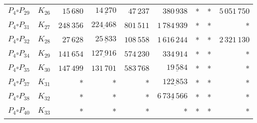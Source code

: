 \begin{tabular}{ccrrrrrrr}
$P_4\square P_{29}$ & $K_{26}$ & $15\,680$ & $\underline{14\,270}$ & $47\,237$ & $380\,938$ & * & * & $5\,051\,750$\\
$P_4\square P_{31}$ & $K_{27}$ & $248\,356$ & $\underline{224\,468}$ & $801\,511$ & $1\,784\,939$ & * & * & *\\
$P_4\square P_{32}$ & $K_{28}$ & $27\,628$ & $\underline{25\,833}$ & $108\,558$ & $1\,616\,244$ & * & * & $2\,321\,130$\\
$P_4\square P_{34}$ & $K_{29}$ & $141\,654$ & $\underline{127\,916}$ & $574\,230$ & $334\,914$ & * & * & *\\
$P_4\square P_{35}$ & $K_{30}$ & $147\,499$ & $131\,701$ & $583\,768$ & $\underline{19\,584}$ & * & * & *\\
$P_4\square P_{37}$ & $K_{31}$ & * & * & * & $\underline{122\,853}$ & * & * & *\\
$P_4\square P_{38}$ & $K_{32}$ & * & * & * & $\underline{6\,734\,566}$ & * & * & *\\
$P_4\square P_{40}$ & $K_{33}$ & * & * & * & * & * & * & *\\

    \bottomrule
\end{tabular}

